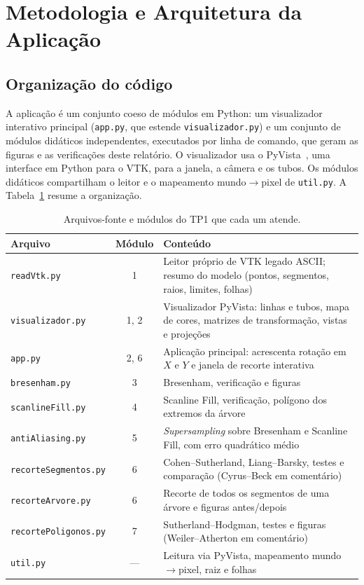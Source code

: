 \documentclass[11pt, a4paper]{article}
\begin{document}
\section{Metodologia e Arquitetura da Aplicação}

\subsection{Organização do código}
A aplicação é um conjunto coeso de módulos em Python: um visualizador interativo principal (\texttt{app.py}, que estende \texttt{visualizador.py}) e um conjunto de módulos didáticos independentes, executados por linha de comando, que geram as figuras e as verificações deste relatório. O visualizador usa o PyVista~\cite{sullivan2019}, uma interface em Python para o VTK, para a janela, a câmera e os tubos. Os módulos didáticos compartilham o leitor e o mapeamento mundo$\to$pixel de \texttt{util.py}. A Tabela~\ref{tab:arquivos} resume a organização.

\begin{table}[htbp]
  \centering
  \small
  \caption{Arquivos-fonte e módulos do TP1 que cada um atende.}
  \label{tab:arquivos}
  \begin{tabularx}{\textwidth}{l c X}
    \toprule
    \textbf{Arquivo} & \textbf{Módulo} & \textbf{Conteúdo} \\
    \midrule
    \texttt{readVtk.py} & 1 & Leitor próprio de VTK legado ASCII; resumo do modelo (pontos, segmentos, raios, limites, folhas) \\
    \texttt{visualizador.py} & 1, 2 & Visualizador PyVista: linhas e tubos, mapa de cores, matrizes de transformação, vistas e projeções \\
    \texttt{app.py} & 2, 6 & Aplicação principal: acrescenta rotação em $X$ e $Y$ e janela de recorte interativa \\
    \texttt{bresenham.py} & 3 & Bresenham, verificação e figuras \\
    \texttt{scanlineFill.py} & 4 & Scanline Fill, verificação, polígono dos extremos da árvore \\
    \texttt{antiAliasing.py} & 5 & \emph{Supersampling} sobre Bresenham e Scanline Fill, com erro quadrático médio \\
    \texttt{recorteSegmentos.py} & 6 & Cohen--Sutherland, Liang--Barsky, testes e comparação (Cyrus--Beck em comentário) \\
    \texttt{recorteArvore.py} & 6 & Recorte de todos os segmentos de uma árvore e figuras antes/depois \\
    \texttt{recortePoligonos.py} & 7 & Sutherland--Hodgman, testes e figuras (Weiler--Atherton em comentário) \\
    \texttt{util.py} & --- & Leitura via PyVista, mapeamento mundo$\to$pixel, raiz e folhas \\
    \bottomrule
  \end{tabularx}
\end{table}
\end{document}
